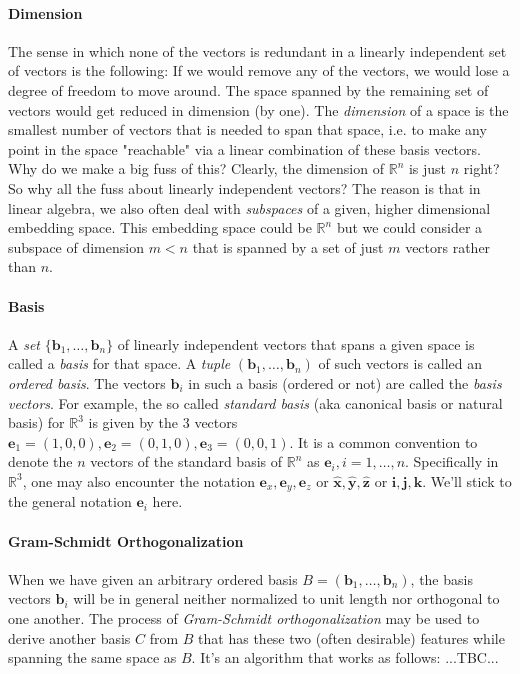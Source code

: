 \paragraph{Dimension}
The sense in which none of the vectors is redundant in a linearly independent set of vectors is the following: If we would remove any of the vectors, we would lose a degree of freedom to move around. The space spanned by the remaining set of vectors would get reduced in dimension (by one). The \emph{dimension} of a space is the smallest number of vectors that is needed to span that space, i.e. to make any point in the space "reachable" via a linear combination of these basis vectors. Why do we make a big fuss of this? Clearly, the dimension of $\mathbb{R}^n$ is just $n$ right? So why all the fuss about linearly independent vectors? The reason is that in linear algebra, we also often deal with \emph{subspaces} of a given, higher dimensional embedding space. This embedding space could be $\mathbb{R}^n$ but we could consider a subspace of dimension $m < n$ that is spanned by a set of just $m$ vectors rather than $n$.


\paragraph{Basis}
A \emph{set} $\{\mathbf{b}_1, \ldots, \mathbf{b}_n \}$ of linearly independent vectors that spans a given space is called a \emph{basis} for that space. A \emph{tuple} $(\mathbf{b}_1, \ldots, \mathbf{b}_n)$ of such vectors is called an \emph{ordered basis}. The vectors $\mathbf{b}_i$ in such a basis (ordered or not) are called the \emph{basis vectors}. For example, the so called \emph{standard basis} (aka canonical basis or natural basis) for $\mathbb{R}^3$ is given by the 3 vectors $\mathbf{e}_1 = (1,0,0), \mathbf{e}_2 = (0,1,0), \mathbf{e}_3 = (0,0,1)$. It is a common convention to denote the $n$ vectors of the standard basis of $\mathbb{R}^n$ as $\mathbf{e}_i, i = 1,\ldots,n$. Specifically in $\mathbb{R}^3$, one may also encounter the notation $\mathbf{e}_x, \mathbf{e}_y, \mathbf{e}_z$ or $\hat{\mathbf{x}}, \hat{\mathbf{y}}, \hat{\mathbf{z}}$ or  $\mathbf{i}, \mathbf{j}, \mathbf{k}$. We'll stick to the general notation $\mathbf{e}_i$ here.


\paragraph{Gram-Schmidt Orthogonalization}
When we have given an arbitrary ordered basis $B = (\mathbf{b}_1, \ldots, \mathbf{b}_n)$, the basis vectors $\mathbf{b}_i$ will be in general neither normalized to unit length nor orthogonal to one another. The process of \emph{Gram-Schmidt orthogonalization} may be used to derive another basis $C$ from $B$ that has these two (often desirable) features while spanning the same space as $B$. It's an algorithm that works as follows: ...TBC...

